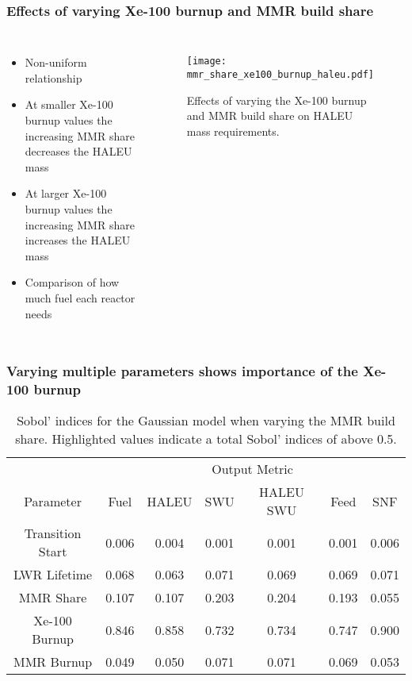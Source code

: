 \begin{frame}
    \frametitle{Effects of varying Xe-100 burnup and MMR build share}
    \begin{columns}

        \column[t]{4cm}
        \begin{itemize}
            \item Non-uniform relationship
            \item At smaller Xe-100 burnup values the increasing MMR 
                  share decreases the HALEU mass
            \item At larger Xe-100 burnup values the increasing MMR share 
                  increases the HALEU mass
            \item Comparison of how much fuel each reactor needs
        \end{itemize}

    \column[t]{6cm}
    \vspace{-1cm}
    \begin{figure}
        \centering 
            \texttt{[image: mmr\_share\_xe100\_burnup\_haleu.pdf]}
            \caption{Effects of varying the Xe-100 burnup and MMR build 
            share on HALEU mass requirements. }
            \label{fig:mmr_share_xe100_bu}
    \end{figure}

\end{columns}
\end{frame}

\begin{frame}
    \frametitle{Varying multiple parameters shows importance of the 
    Xe-100 burnup}
    \begin{table}[h!]
        \centering
        \caption{Sobol' indices for the Gaussian model when varying the MMR 
        build share. Highlighted 
        values indicate a total Sobol' indices of above 0.5.}
        \label{tab:s7_sobol_mmr_gaussian}
        \begin{tabular}{c c c c c c c }
            \hline
            & \multicolumn{6}{c}{Output Metric} \\
            Parameter & Fuel & HALEU & SWU & HALEU SWU & Feed & SNF\\
            \hline
            Transition Start & 0.006 & 0.004 & 0.001 &
                               0.001 & 0.001 & 0.006\\
            LWR Lifetime & 0.068 & 0.063 & 0.071 &
                           0.069 & 0.069 & 0.071\\
            MMR Share & 0.107 & 0.107 & 0.203 &
                              0.204 & 0.193 & 0.055\\
            Xe-100 Burnup & \cellcolor{green!25}0.846 & \cellcolor{green!25}0.858 & \cellcolor{green!25}0.732 &
            \cellcolor{green!25}0.734 & \cellcolor{green!25}0.747 & \cellcolor{green!25}0.900\\
            MMR Burnup & 0.049 & 0.050 & 0.071 &
                         0.071 & 0.069 & 0.053\\
            \hline        
        \end{tabular}
    \end{table}
\end{frame}

